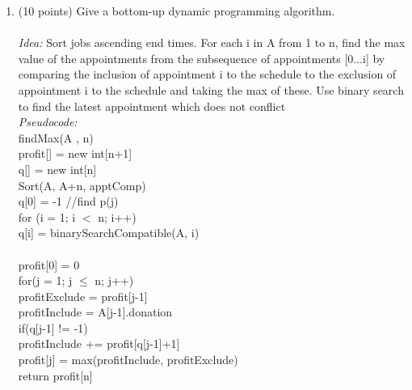 \documentclass[12pt]{article}
\begin{document}
\begin{enumerate}
\begin{enumerate}
\pagebreak
    \item \label{2d} (10 points) Give a bottom-up dynamic programming algorithm.\\
\\
\textit{Idea:} Sort jobs ascending end times. For each i in A from 1 to n, find the max value of the appointments from the subsequence of appointments [0...i] by comparing the inclusion of appointment i to the schedule to the exclusion of appointment i to the schedule and taking the max of these. Use binary search to find the latest appointment which does not conflict\\
\textit{Pseudocode:} \\
findMax(A , n) \\
\hspace*{10mm} profit[] = new int[n+1]\\
\hspace*{10mm} q[] = new int[n]\\
\hspace*{10mm} Sort(A, A+n, apptComp) \\
\hspace*{10mm} q[0] = -1 \hspace*{10mm} //find p(j) \\
\hspace*{10mm}for (i = 1; i $<$ n; i++) \\
\hspace*{15mm} q[i] = binarySearchCompatible(A, i)\\
\\
\hspace*{10mm} profit[0] = 0\\
\hspace*{10mm} for(j = 1; j $\leq$ n; j++)\\
\hspace*{15mm} profitExclude = profit[j-1]\\
\hspace*{15mm} profitInclude = A[j-1].donation\\
\hspace*{15mm} if(q[j-1] != -1)\\
\hspace*{20mm} profitInclude += profit[q[j-1]+1]\\
\hspace*{15mm} profit[j] = max(profitInclude, profitExclude)\\
\hspace*{10mm} return profit[n] \\
\\

\end{enumerate}
\end{enumerate}
\end{document}
